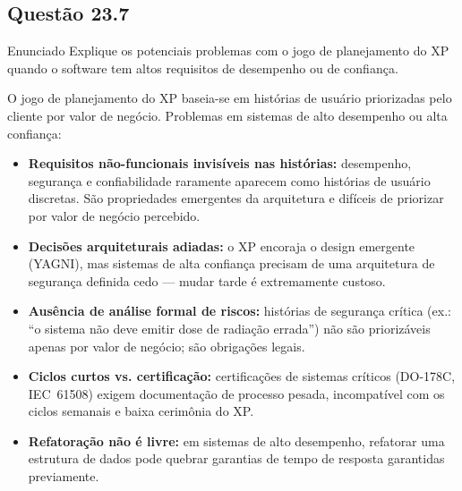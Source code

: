 \documentclass[12pt,a4paper]{article}
\begin{document}
\subsection*{Questão 23.7}
\begin{questao}{Enunciado}
Explique os potenciais problemas com o jogo de planejamento do XP quando o
software tem altos requisitos de desempenho ou de confiança.
\end{questao}
\begin{resposta}
O jogo de planejamento do XP baseia-se em histórias de usuário priorizadas
pelo cliente por valor de negócio. Problemas em sistemas de alto desempenho
ou alta confiança:

\begin{itemize}[nosep]
  \item \textbf{Requisitos não-funcionais invisíveis nas histórias:} desempenho,
        segurança e confiabilidade raramente aparecem como histórias de usuário
        discretas. São propriedades emergentes da arquitetura e difíceis de
        priorizar por valor de negócio percebido.
  \item \textbf{Decisões arquiteturais adiadas:} o XP encoraja o design emergente
        (YAGNI), mas sistemas de alta confiança precisam de uma arquitetura
        de segurança definida cedo — mudar tarde é extremamente custoso.
  \item \textbf{Ausência de análise formal de riscos:} histórias de segurança
        crítica (ex.: ``o sistema não deve emitir dose de radiação errada'')
        não são priorizáveis apenas por valor de negócio; são obrigações legais.
  \item \textbf{Ciclos curtos vs. certificação:} certificações de sistemas
        críticos (DO-178C, IEC~61508) exigem documentação de processo pesada,
        incompatível com os ciclos semanais e baixa cerimônia do XP.
  \item \textbf{Refatoração não é livre:} em sistemas de alto desempenho,
        refatorar uma estrutura de dados pode quebrar garantias de tempo de
        resposta garantidas previamente.
\end{itemize}
\end{resposta}

\end{document}
